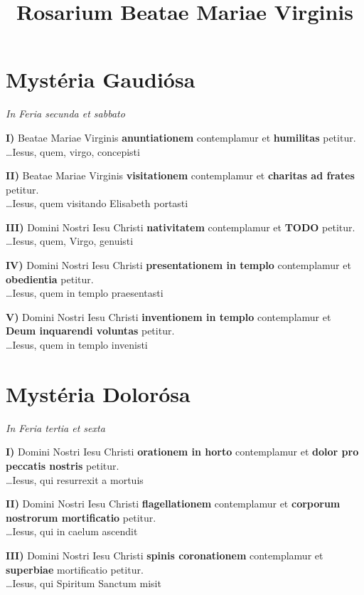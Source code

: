 \documentclass[paper=a5,pagesize=pdftex,fontsize=10pt,headinclude=on,twoside=off]{scrbook}
\title{Rosarium Beatae Mariae Virginis}
\newcommand{\mysterium}[1]{\textbf{#1}}
\newcommand{\fructum}[1]{\textbf{#1}}
\newcommand{\dies}[1]{\vspace{-0.6cm}\begin{center}\textit{\tiny#1}\end{center}\vspace{-0.1cm}}
\begin{document}
\pagestyle{empty}


\section{Mystéria Gaudiósa}
\dies{In Feria secunda et sabbato}

\textbf{I)} Beatae Mariae Virginis \mysterium{anuntiationem} contemplamur et \fructum{humilitas} petitur.\\
\ldots Iesus, quem, virgo, concepisti

\textbf{II)} Beatae Mariae Virginis \mysterium{visitationem} contemplamur et \fructum{charitas ad frates} petitur.\\
\ldots Iesus, quem visitando Elisabeth portasti

\textbf{III)} Domini Nostri Iesu Christi \mysterium{nativitatem} contemplamur et \fructum{TODO} petitur.\\
\ldots Iesus, quem, Virgo, genuisti

\textbf{IV)} Domini Nostri Iesu Christi \mysterium{presentationem in templo} contemplamur et \fructum{obedientia} petitur.\\
\ldots Iesus, quem in templo praesentasti

\textbf{V)} Domini Nostri Iesu Christi \mysterium{inventionem in templo} contemplamur et \fructum{Deum inquarendi voluntas} petitur.\\
\ldots Iesus, quem in templo invenisti

\section{Mystéria Dolorósa}
\dies{In Feria tertia et sexta}

\textbf{I)} Domini Nostri Iesu Christi \mysterium{orationem in horto} contemplamur et \fructum{dolor pro peccatis nostris} petitur.\\
\ldots Iesus, qui resurrexit a mortuis

\textbf{II)} Domini Nostri Iesu Christi \mysterium{flagellationem} contemplamur et \fructum{corporum nostrorum mortificatio} petitur.\\
\ldots Iesus, qui in caelum ascendit

\textbf{III)} Domini Nostri Iesu Christi \mysterium{spinis coronationem} contemplamur et \fructum{superbiae} mortificatio petitur.\\
\ldots Iesus, qui Spiritum Sanctum misit
\end{document}
